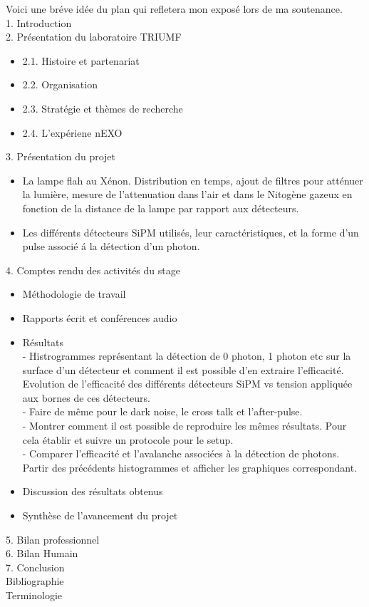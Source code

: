 \documentclass[a4paper, 11pt]{report}%
\begin{document}
  Voici une br\'eve id\'ee du plan qui refletera mon expos\' e lors de ma soutenance.
  \\
  1. Introduction
  \\
  2. Pr\'esentation du laboratoire TRIUMF
  \begin{itemize}
  \item 2.1. Histoire et partenariat
  \item 2.2. Organisation
  \item 2.3. Strat\' egie et th\` emes de recherche
  \item 2.4. L'exp\' eriene nEXO
  \end{itemize}
  3. Pr\' esentation du projet
  \begin{itemize}
  \item La lampe flah au X\'enon. Distribution en temps, ajout de filtres pour att\'enuer la lumi\`ere, mesure de l'attenuation dans l'air et dans 
  le Nitog\`ene gazeux en fonction de la distance de la lampe par rapport aux d\'etecteurs.
  \item Les diff\'erents d\'etecteurs SiPM utilis\'es, leur caract\'eristiques, et la forme d'un pulse associ\'e \' a la d\'etection d'un photon.
  \end{itemize}
  4.  Comptes rendu des activit\'es du stage
  \begin{itemize}
  \item M\'ethodologie de travail
  \item Rapports \'ecrit et conf\'erences audio
  \item R\'esultats
  \\
  - Histrogrammes repr\'esentant la d\'etection de 0 photon, 1 photon etc sur la surface d'un d\'etecteur et comment il est possible d'en extraire 
  l'efficacit\'e. Evolution de l'efficacit\'e des diff\'erents d\'etecteurs SiPM vs tension appliqu\'ee aux bornes de ces d\'etecteurs.
  \\
  - Faire de m\^eme pour le dark noise, le cross talk et l'after-pulse. 
  \\
  - Montrer comment il est possible de reproduire les m\^emes r\'esultats. Pour cela \'etablir et suivre un protocole pour le setup.
  \\
  - Comparer l'efficacit\'e et l'avalanche associ\'ees \`a la d\'etection de photons. Partir des pr\'ec\'edents histogrammes et afficher les graphiques correspondant. 
  \item Discussion des r\'esultats obtenus
  \item Synth\` ese de l'avancement du projet
  \end{itemize}
  5. Bilan professionnel
  \\
  6. Bilan Humain
  \\
  7. Conclusion
  \\
  Bibliographie
  \\
  Terminologie
  \\
\end{document}
